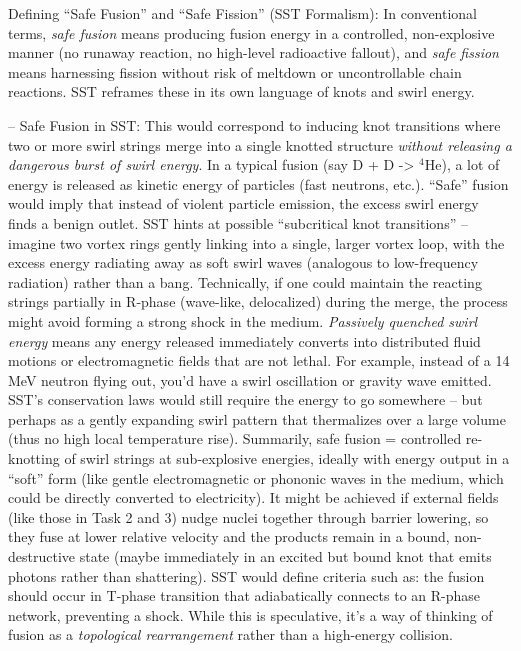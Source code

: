 \documentclass[11pt]{article}
\begin{document}
Defining “Safe Fusion” and “Safe Fission” (SST Formalism): In conventional terms, \textit{safe fusion} means producing fusion energy in a controlled, non-explosive manner (no runaway reaction, no high-level radioactive fallout), and \textit{safe fission} means harnessing fission without risk of meltdown or uncontrollable chain reactions. SST reframes these in its own language of knots and swirl energy.


– Safe Fusion in SST: This would correspond to inducing knot transitions where two or more swirl strings merge into a single knotted structure \textit{without releasing a dangerous burst of swirl energy}. In a typical fusion (say D + D -> $^4$He), a lot of energy is released as kinetic energy of particles (fast neutrons, etc.). “Safe” fusion would imply that instead of violent particle emission, the excess swirl energy finds a benign outlet. SST hints at possible “subcritical knot transitions” – imagine two vortex rings gently linking into a single, larger vortex loop, with the excess energy radiating away as soft swirl waves (analogous to low-frequency radiation) rather than a bang. Technically, if one could maintain the reacting strings partially in R-phase (wave-like, delocalized) during the merge, the process might avoid forming a strong shock in the medium. \textit{Passively quenched swirl energy} means any energy released immediately converts into distributed fluid motions or electromagnetic fields that are not lethal. For example, instead of a 14 MeV neutron flying out, you’d have a swirl oscillation or gravity wave emitted. SST’s conservation laws would still require the energy to go somewhere – but perhaps as a gently expanding swirl pattern that thermalizes over a large volume (thus no high local temperature rise). Summarily, safe fusion = controlled re-knotting of swirl strings at sub-explosive energies, ideally with energy output in a “soft” form (like gentle electromagnetic or phononic waves in the medium, which could be directly converted to electricity). It might be achieved if external fields (like those in Task 2 and 3) nudge nuclei together through barrier lowering, so they fuse at lower relative velocity and the products remain in a bound, non-destructive state (maybe immediately in an excited but bound knot that emits photons rather than shattering). SST would define criteria such as: the fusion should occur in T-phase transition that adiabatically connects to an R-phase network, preventing a shock. While this is speculative, it’s a way of thinking of fusion as a \textit{topological rearrangement} rather than a high-energy collision.
\end{document}
